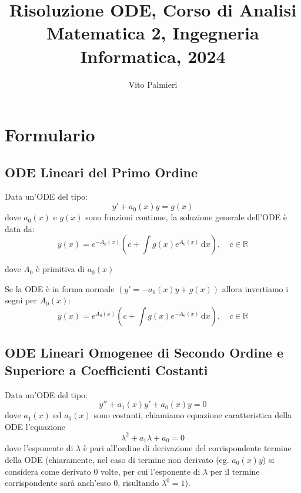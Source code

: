 \documentclass[a4paper,11pt]{article}
\author{Vito Palmieri}
\title{Risoluzione ODE, Corso di Analisi Matematica 2, Ingegneria Informatica, 2024}
\newcommand{\ud}{\,\mathrm{d}}
\newcommand*{\nsection}[1]{
    \section*{#1}
    \addcontentsline{toc}{section}{#1}
}
\begin{document}
\maketitle
\tableofcontents
\clearpage
\nsection{Formulario}
\subsection[ODE Lineari Primo Ordine]{ODE Lineari del Primo Ordine}
Data un'ODE del tipo:
\begin{equation*}
    y' + a_0(x)y = g(x)
\end{equation*}
dove $a_0(x)$ e $g(x)$ sono funzioni continue, la soluzione generale dell'ODE è data da:
\begin{equation*}
    y(x) = e^{-A_0(x)} \left(c + \int g(x)e^{A_0(x)} \ud x\right), \quad c \in \mathbb{R}
\end{equation*}

dove $A_0$ è primitiva di $a_0(x)$

Se la ODE è in forma normale $(y' = -a_0(x)y + g(x))$ allora invertiamo i segni per $A_0(x)$:
\begin{equation*}
    y(x) = e^{A_0(x)} \left(c + \int g(x)e^{-A_0(x)} \ud x\right), \quad c \in \mathbb{R}
\end{equation*}

\subsection[ODE Lineari Omogenee]{ODE Lineari Omogenee di Secondo Ordine e Superiore a Coefficienti Costanti}
Data un'ODE del tipo:
\begin{equation*}
    y'' + a_1(x)y' + a_0(x)y = 0
\end{equation*}
dove $a_1(x)$ ed $a_0(x)$ sono costanti, chiamiamo equazione caratteristica della ODE l'equazione
\begin{equation*}
    \lambda^2 + a_1\lambda + a_0 = 0
\end{equation*}
dove l'esponente di $\lambda$ è pari all'ordine di derivazione del corrispondente termine della ODE (chiaramente, nel caso di termine non derivato (eg. $a_0(x)y$) si considera come derivato 0 volte, per cui l'esponente di $\lambda$ per il termine corrispondente sarà anch'esso $0$, risultando $\lambda^0=1$).
\end{document}
